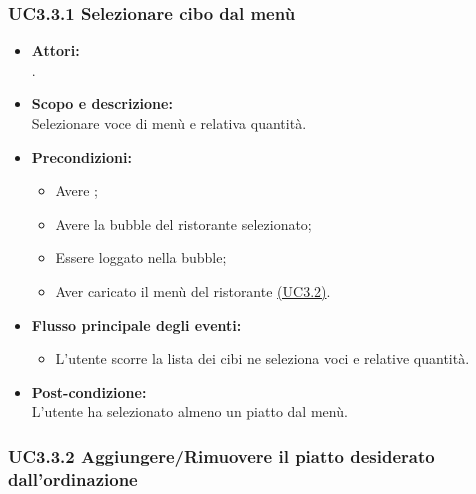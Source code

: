 \subsubsection{UC3.3.1 Selezionare cibo dal menù} \label{UC3.3.1}

\begin{itemize}
	\item \textbf{Attori:}
	\\.
	\item \textbf{Scopo e descrizione:} 
	\\Selezionare voce di menù e relativa quantità.
	\item \textbf{Precondizioni:}
	\begin{itemize}
		\item Avere ;
		\item Avere la bubble del ristorante selezionato;
		\item Essere loggato nella bubble;
		\item Aver caricato il menù del ristorante \hyperref[UC3.2]{(UC3.2)}.
	\end{itemize}
	\item \textbf{Flusso principale degli eventi:}
	\begin{itemize}
		\item L'utente scorre la lista dei cibi ne seleziona voci e relative quantità.
	\end{itemize}
	\item \textbf{Post-condizione:}
	\\L’utente ha selezionato almeno un piatto dal menù.
\end{itemize}

\subsubsection{UC3.3.2 Aggiungere/Rimuovere il piatto desiderato dall'ordinazione} \label{UC3.3.2}

